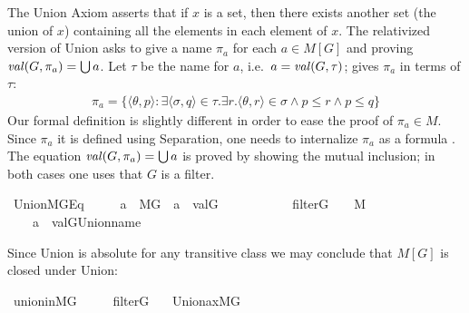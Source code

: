 The Union Axiom asserts that if $x$ is a set, then there exists
another set (the union of $x$) containing all the elements in each
element of $x$. The relativized version of Union asks to give a name
$\pi_a$ for each $a\in M[G]$ and proving $\operatorname{\mathit{val}}(G,\pi_a)=\mathop{\textstyle\bigcup} a$.
Let $\tau$ be the name for $a$, i.e.\ $a=\operatorname{\mathit{val}}(G,\tau)$; 
\citet{kunen2011set} gives $\pi_a$ in terms of $\tau$:
\begin{align*}
  \pi_a = \{\langle\theta,p \rangle :  %
\exists \langle\sigma,q\rangle  \in \tau .
 \exists r . \langle \theta,r\rangle \in \sigma \wedge
    p\leqslant r \wedge p \leqslant q \}
\end{align*}
Our formal definition is slightly different in order to ease the proof of
$\pi_a \in M$.  Since $\pi_a$ it is defined using Separation, one
needs to internalize $\pi_a$ as a formula
. The
equation $\operatorname{\mathit{val}}(G,\pi_a)=\mathop{\textstyle\bigcup} a$ is proved by showing the mutual
inclusion; in both cases one uses that $G$ is a filter.
\begin{isabelle}
  \isamarkupfalse%
\ Union{\isacharunderscore}MG{\isacharunderscore}Eq\ {\isacharcolon}\ \isanewline
\ \ \ {\isachardoublequoteopen}a\ {\isasymin}\ M{\isacharbrackleft}G{\isacharbrackright}{\isachardoublequoteclose}\ \ {\isachardoublequoteopen}a\ {\isacharequal}\ val{\isacharparenleft}G{\isacharcomma}{\isasymtau}{\isacharparenright}{\isachardoublequoteclose}\ \isanewline
\ \ \ \ \ \ \ \ \ \ {\isachardoublequoteopen}filter{\isacharparenleft}G{\isacharparenright}{\isachardoublequoteclose}\ \ {\isachardoublequoteopen}{\isasymtau}\ {\isasymin}\ M{\isachardoublequoteclose}\isanewline
\ \ \ {\isachardoublequoteopen}{\isasymUnion}\ a\ {\isacharequal}\ val{\isacharparenleft}G{\isacharcomma}Union{\isacharunderscore}name{\isacharparenleft}{\isasymtau}{\isacharparenright}{\isacharparenright}{\isachardoublequoteclose}
\end{isabelle}
Since Union is absolute for any transitive class we may conclude that
$M[G]$ is closed under Union:
\begin{isabelle}
  \isamarkupfalse%
  \ union{\isacharunderscore}in{\isacharunderscore}MG\ {\isacharcolon}\ \isanewline
  \ \ \ {\isachardoublequoteopen}filter{\isacharparenleft}G{\isacharparenright}{\isachardoublequoteclose}\isanewline
\ \ \ {\isachardoublequoteopen}Union{\isacharunderscore}ax{\isacharparenleft}{\isacharhash}{\isacharhash}M{\isacharbrackleft}G{\isacharbrackright}{\isacharparenright}{\isachardoublequoteclose}
\end{isabelle}

